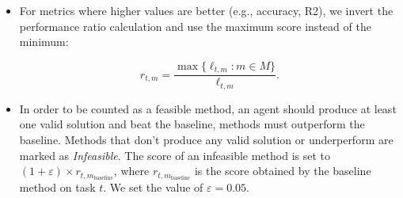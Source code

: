 \begin{itemize}
    \item {} For metrics where higher values are better (e.g., accuracy, R2), we invert the performance ratio calculation and use the maximum score instead of the minimum: 

          \begin{equation}
              r_{t,m} = \frac{\max\{\ell_{t,m}: m \in M\}}{\ell_{t,m}}.
          \end{equation}

    \item {} In order to be counted as a feasible method, an agent should produce at least one valid solution and beat the baseline, methods must outperform the baseline.
    Methods that don't produce any valid solution or underperform are marked as \textit{Infeasible}. 
    The score of an infeasible method is set to $(1 + \varepsilon) \times r_{t, m_{\text{baseline}}}$, where $r_{t, m_{\text{baseline}}}$ is the score obtained by the baseline method on task $t$. 
    We set the value of $\varepsilon = 0.05$.
\end{itemize}

